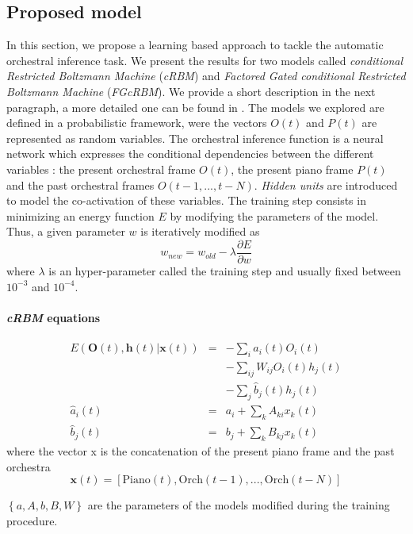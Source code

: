 \documentclass[twoside,twocolumn]{article}
\begin{document}
\subsection{Proposed model}
In this section, we propose a learning based approach to tackle the automatic orchestral inference task.
We present the results for two models called \textit{conditional Restricted Boltzmann Machine} (\textit{cRBM}) and \textit{Factored Gated conditional Restricted Boltzmann Machine} (\textit{FGcRBM}). We provide a short description  in the next paragraph, a more detailed one can be found in \cite{taylor2009factored}.
The models we explored are defined in a probabilistic framework, were the vectors $O(t)$ and $P(t)$ are represented as random variables. The orchestral inference function is a neural network which expresses the conditional dependencies between the different variables : the present orchestral frame $O(t)$, the present piano frame $P(t)$ and the past orchestral frames $O(t-1,...,t-N)$. \textit{Hidden units} are introduced to model the co-activation of these variables.
The training step consists in minimizing an energy function $E$ by modifying the parameters of the model. Thus, a given parameter $w$ is iteratively modified as
\[
w_{new} = w_{old} - \lambda \frac{\partial E}{\partial w}
\]
where $\lambda$ is an hyper-parameter called the training step and usually fixed between $10^{-3}$
and $10^{-4}$.
\paragraph{\textit{cRBM} equations}
\begin{equation}
\begin{array}{rcl}
E(\bm{O}(t),\bm{h}(t)|\bm{x}(t)) & = & - \sum_{i} \hat{a}_{i}(t)O_{i}(t)\\
& & - \sum_{ij}W_{ij}O_{i}(t)h_{j}(t)\\
& & - \sum_{j} \hat{b}_{j}(t)h_{j}(t)\\
\hat{a}_{i}(t) & = & a_{i} + \sum_{k}A_{ki}x_{k}(t)\\
\hat{b}_{j}(t) & = & b_{j} + \sum_{k}B_{kj}x_{k}(t)
\end{array}
\end{equation}
where the vector x is the concatenation of the present piano frame and the past orchestra
\[\bm{x}(t) = \left[ \text{Piano}(t) , \text{Orch}(t-1) , ... , \text{Orch}(t-N)\right]\]

$\left\{a, A, b, B, W\right\}$ are the parameters of the models modified during the training procedure.
\end{document}
